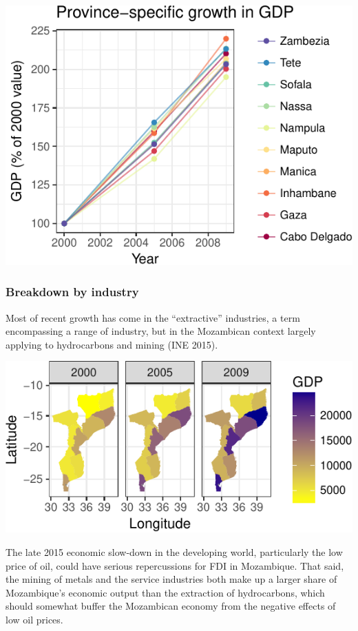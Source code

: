 \documentclass[]{elsarticle} %
\begin{document}
\begin{center}\includegraphics{paper_files/figure-latex/unnamed-chunk-9-1} \end{center}

\subsubsection{Breakdown by industry}\label{breakdown-by-industry}

Most of recent growth has come in the ``extractive'' industries, a term
encompassing a range of industry, but in the Mozambican context largely
applying to hydrocarbons and mining (INE 2015).

\begin{center}\includegraphics{paper_files/figure-latex/unnamed-chunk-10-1} \end{center}

The late 2015 economic slow-down in the developing world, particularly
the low price of oil, could have serious repercussions for FDI in
Mozambique. That said, the mining of metals and the service industries
both make up a larger share of Mozambique's economic output than the
extraction of hydrocarbons, which should somewhat buffer the Mozambican
economy from the negative effects of low oil prices.
\end{document}
